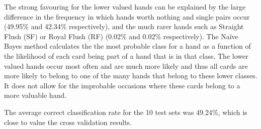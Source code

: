 \documentclass[11pt, a4paper]{article}
\begin{document}
The strong favouring for the lower valued hands can be explained by the large difference in the frequency in which hands worth nothing and single pairs occur (49.95\% and 42.34\% respectively), and the much rarer hands such as Straight Flush (SF) or Royal Flush (RF) (0.02\% and 0.02\% respectively). The Na\"ive Bayes method calculates the the most probable class for a hand as a function of the likelihood of each card being part of a hand that is in that class. The lower valued hands occur most often and are much more likely and thus all cards are more likely to belong to one of the many hands that belong to these lower classes. It does not allow for the improbable occasions where these cards belong to a more valuable hand.

The average correct classification rate for the 10 test sets was 49.24\%, which is close to value the cross validation results. 
\end{document}
